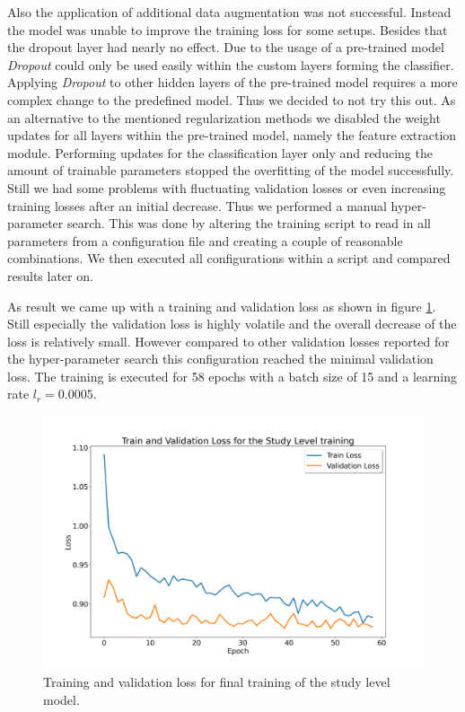 Also the application of additional data augmentation was not successful. Instead the model was unable to improve the training loss for some setups. Besides that the dropout layer had nearly no effect. Due to the usage of a pre-trained model \textit{Dropout} could only be used easily within the custom layers forming the classifier. Applying \textit{Dropout} to other hidden layers of the pre-trained model requires a more complex change to the predefined model. Thus we decided to not try this out.
As an alternative to the mentioned regularization methods we disabled the weight updates for all layers within the pre-trained model, namely the feature extraction module. Performing updates for the classification layer only and reducing the amount of trainable parameters stopped the overfitting of the model successfully. Still we had some problems with fluctuating validation losses or even increasing training losses after an initial decrease. Thus we performed a manual hyper-parameter search. This was done by altering the training script to read in all parameters from a configuration file and creating a couple of reasonable combinations. We then executed all configurations within a script and compared results later on.

As result we came up with a training and validation loss as shown in figure \ref{fig:study-loss}. Still especially the validation loss is highly volatile and the overall decrease of the loss is relatively small. However compared to other validation losses reported for the hyper-parameter search this configuration reached the minimal validation loss. The training is executed for 58 epochs with a batch size of 15 and a learning rate $l_r = 0.0005$.

\begin{figure}
	\centering
	\includegraphics[width=.7\linewidth]{img/loss_study_level_ep58.png}
	\caption{Training and validation loss for final training of the study level model.}
	\label{fig:study-loss}
\end{figure}
